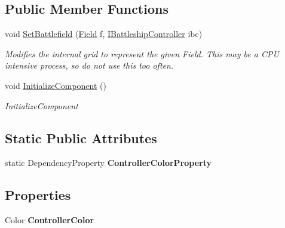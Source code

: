 \subsection*{Public Member Functions}
\begin{DoxyCompactItemize}
\item 
void \hyperlink{class_m_b_c_1_1_app_1_1_w_p_f_1_1_field_control_a443ed9690cf8a37c9b535f41974ed8b2}{Set\-Battlefield} (\hyperlink{class_m_b_c_1_1_core_1_1_field}{Field} f, \hyperlink{interface_m_b_c_1_1_core_1_1_i_battleship_controller}{I\-Battleship\-Controller} ibc)
\begin{DoxyCompactList}\small\item\em Modifies the internal grid to represent the given Field. This may be a C\-P\-U intensive process, so do not use this too often.\end{DoxyCompactList}\item 
void \hyperlink{class_m_b_c_1_1_app_1_1_w_p_f_1_1_field_control_a42a985ed0daa8768932b77eaf87b65b4}{Initialize\-Component} ()
\begin{DoxyCompactList}\small\item\em Initialize\-Component \end{DoxyCompactList}\end{DoxyCompactItemize}
\subsection*{Static Public Attributes}
\begin{DoxyCompactItemize}
\item 
\hypertarget{class_m_b_c_1_1_app_1_1_w_p_f_1_1_field_control_a22678546fbb0ccc55e06cc2f0d9dcd37}{static Dependency\-Property {\bfseries Controller\-Color\-Property}}\label{class_m_b_c_1_1_app_1_1_w_p_f_1_1_field_control_a22678546fbb0ccc55e06cc2f0d9dcd37}

\end{DoxyCompactItemize}
\subsection*{Properties}
\begin{DoxyCompactItemize}
\item 
\hypertarget{class_m_b_c_1_1_app_1_1_w_p_f_1_1_field_control_ae608f81c79edd50c22d3bd20ce824c96}{Color {\bfseries Controller\-Color}}\label{class_m_b_c_1_1_app_1_1_w_p_f_1_1_field_control_ae608f81c79edd50c22d3bd20ce824c96}

\end{DoxyCompactItemize}



